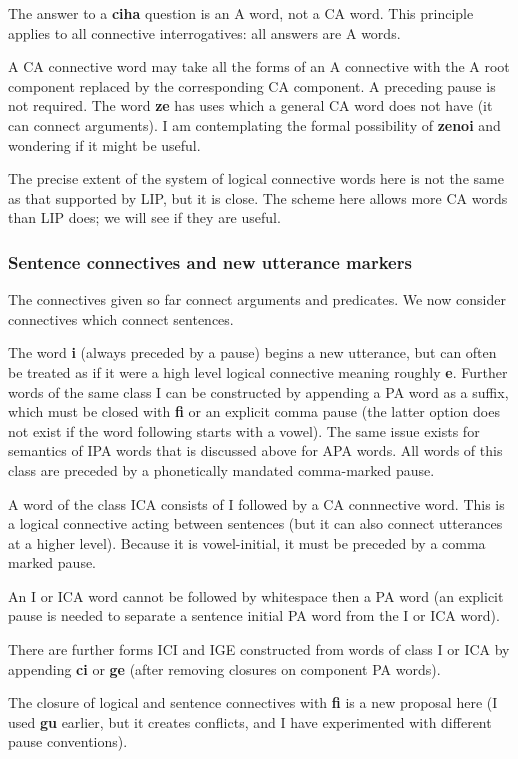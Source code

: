 \documentclass[12pt]{book}
\begin{document}
{The answer to a {\bf ciha} question is an A word, not a CA word.  This principle applies to all connective interrogatives:  all answers are A words.

A CA connective word may take all the forms of an A connective with the A root component replaced by the corresponding CA component.   A preceding pause is not required.  The word {\bf ze} has uses which a general CA word does not have (it can connect arguments).  I am contemplating the formal possibility of {\bf zenoi} and wondering if it might be useful.  

The precise extent of the system of logical connective words here is not the same as that supported by LIP, but it is close.  The scheme here allows more CA words than LIP does; we will see if they are useful.

\subsubsection{Sentence connectives and new utterance markers}

The connectives given so far connect arguments and predicates.   We now consider connectives which connect sentences.

The word {\bf i} (always preceded by a pause) begins a new utterance, but can often be treated as if it were a high level logical connective meaning roughly {\bf e}.  Further words of the same class I can be constructed by appending a PA word as a suffix, which must be closed with {\bf fi} or an explicit comma pause (the latter option does not exist if the word following starts with a vowel).  The same issue exists for semantics of IPA words that is discussed above for APA words.   All words of this class are preceded by a phonetically mandated comma-marked pause.

A word of the class ICA consists of I followed by a CA connnective word.   This is a logical connective acting between sentences (but it can also connect utterances at a higher level).   Because it is vowel-initial, it must be preceded
by a comma marked pause.

An I or ICA word cannot be followed by whitespace then a PA word (an explicit pause is needed to separate a sentence initial PA word from the I or ICA word).

There are further forms ICI and IGE constructed from words of class I or ICA  by appending {\bf ci} or {\bf ge} (after removing closures on component PA words).

The closure of logical and sentence connectives with {\bf fi} is a new proposal here (I used {\bf gu} earlier, but it creates conflicts, and I have experimented with different pause conventions).

}
\end{document}
